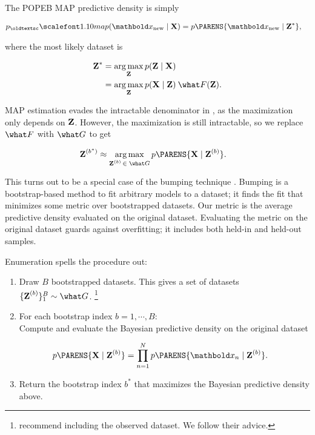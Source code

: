 The \gls{POPEB} \gls{MAP} predictive density is simply
\begin{linenomath}
\begin{align*}
  p_\textsc{map}(\xnew \mid \mbX)
  &=
  p\PARENS{\xnew \mid \mbZ^*},
\end{align*}
\end{linenomath}
where the most likely dataset is
\begin{linenomath}
\begin{align*}
  \mbZ^*
  &= \argmax_{\mbZ} p(\mbZ \mid \mbX)\\
  &= \argmax_{\mbZ} p(\mbX\mid \mbZ)\: \what F(\mbZ).
\end{align*}
\end{linenomath}
\gls{MAP} estimation evades the intractable denominator in
, as the maximization only depends on $\textbf{Z}$.
However, the maximization is still intractable, so we replace $\what F$ with
$\what G$ to get
\begin{linenomath}
\begin{align*}
  \mbZ^{(b^*)}
  &\approx
  \argmax_{\mbZ^{(b)} \,\in\; \what G}
  p\PARENS{\mbX \mid \mbZ^{(b)}}.
\end{align*}
\end{linenomath}
This turns out to be a special case of the bumping technique
\citep{tibshirani1999model}.
Bumping is a bootstrap-based method to fit arbitrary models to a dataset; it
finds the fit
that minimizes some metric over bootstrapped datasets. Our metric is the
average predictive density evaluated on the original dataset. Evaluating the
metric on the original dataset guards against overfitting; it includes both
held-in and held-out samples.

Enumeration spells the procedure out:
\begin{enumerate}
  \item Draw $B$ bootstrapped datasets.
        This gives a set of datasets
        $\{\mbZ^{(b)}\}_1^B \sim \what G $.%
        \footnote{\cite{tibshirani1999model} recommend including the
        observed dataset. We follow their advice.}
  \item For each bootstrap index $b=1,\cdots,B$:\\
  Compute and evaluate the Bayesian predictive density on the original dataset
    \begin{linenomath}
    \begin{align*}
      p\PARENS{\mbX \mid\mbZ^{(b)}}
      &=
      \prod_{n=1}^N
      p\PARENS{\mbx_n \mid\mbZ^{(b)}}.
    \end{align*}
    \end{linenomath}
  \item Return the bootstrap index $b^*$ that maximizes the
  Bayesian predictive density above.
\end{enumerate}


